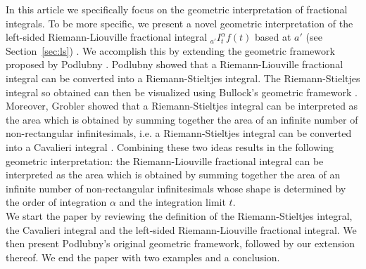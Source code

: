 \documentclass[twoside,reqno,11pt]{fcaa-var} %
\begin{document}
\noindent
In this article we specifically focus on the geometric interpretation of fractional integrals. To be more specific, we present a novel geometric interpretation of the left-sided Riemann-Liouville fractional integral $_{a'}I_t^{\alpha} f(t)$ based at $a'$ (see Section~\ref{sec:ls}) \cite{laurent1884}. We accomplish this by extending the geometric framework proposed by Podlubny \cite{podlubny02}.
Podlubny showed that a Riemann-Liouville fractional integral can be converted into a Riemann-Stieltjes integral. The Riemann-Stieltjes integral so obtained can then be visualized using Bullock's geometric framework \cite{bullock88}. Moreover, Grobler showed that a Riemann-Stieltjes integral can be interpreted as the area which is obtained by summing together the area of an infinite number of non-rectangular infinitesimals, i.e. a Riemann-Stieltjes integral can be converted into a Cavalieri integral \cite{ackermann12,grobler19}. Combining these two ideas results in the following geometric interpretation: the Riemann-Liouville fractional integral can be interpreted as the area which is obtained by summing together the area of an infinite number of non-rectangular infinitesimals whose shape is determined by the order of integration $\alpha$ and the integration limit $t$.\\

\noindent
We start the paper by reviewing the definition of the Riemann-Stieltjes integral, the Cavalieri integral and the left-sided Riemann-Liouville fractional integral. We then present Podlubny's original geometric framework, followed by our extension thereof. We end the paper with two examples and a conclusion.
\end{document}
